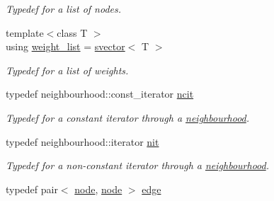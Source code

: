 \begin{DoxyCompactItemize}
\begin{DoxyCompactList}\small\item\em Typedef for a list of nodes. \end{DoxyCompactList}\item 
{\footnotesize template$<$class T $>$ }\\using \hyperlink{namespacelgraph_1_1utils_a11e7963f3637ea13778b8d3e69d2c17f}{weight\+\_\+list} = \hyperlink{classlgraph_1_1utils_1_1svector}{svector}$<$ T $>$\hypertarget{namespacelgraph_1_1utils_a11e7963f3637ea13778b8d3e69d2c17f}{}\label{namespacelgraph_1_1utils_a11e7963f3637ea13778b8d3e69d2c17f}

\begin{DoxyCompactList}\small\item\em Typedef for a list of weights. \end{DoxyCompactList}\item 
typedef neighbourhood\+::const\+\_\+iterator \hyperlink{namespacelgraph_1_1utils_a7207b078932845778282f5e2e373575b}{ncit}\hypertarget{namespacelgraph_1_1utils_a7207b078932845778282f5e2e373575b}{}\label{namespacelgraph_1_1utils_a7207b078932845778282f5e2e373575b}

\begin{DoxyCompactList}\small\item\em Typedef for a constant iterator through a \hyperlink{namespacelgraph_1_1utils_a0f2ef47028a466d26841709e705390ac}{neighbourhood}. \end{DoxyCompactList}\item 
typedef neighbourhood\+::iterator \hyperlink{namespacelgraph_1_1utils_af5daf6fe356a9014746bdb507787ae01}{nit}\hypertarget{namespacelgraph_1_1utils_af5daf6fe356a9014746bdb507787ae01}{}\label{namespacelgraph_1_1utils_af5daf6fe356a9014746bdb507787ae01}

\begin{DoxyCompactList}\small\item\em Typedef for a non-\/constant iterator through a \hyperlink{namespacelgraph_1_1utils_a0f2ef47028a466d26841709e705390ac}{neighbourhood}. \end{DoxyCompactList}\item 
typedef pair$<$ \hyperlink{namespacelgraph_1_1utils_ab9c6b34241f0b68372c55f34c460e863}{node}, \hyperlink{namespacelgraph_1_1utils_ab9c6b34241f0b68372c55f34c460e863}{node} $>$ \hyperlink{namespacelgraph_1_1utils_a6510284ce1b1ae5dc97ce5d2de426e10}{edge}\hypertarget{namespacelgraph_1_1utils_a6510284ce1b1ae5dc97ce5d2de426e10}{}\label{namespacelgraph_1_1utils_a6510284ce1b1ae5dc97ce5d2de426e10}


\end{DoxyCompactItemize}
